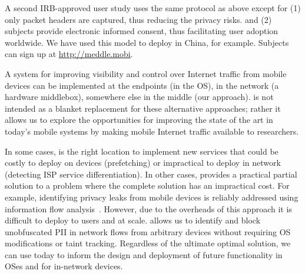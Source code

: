 A second IRB-approved \meddle user study uses the same protocol as above except 
for (1) only packet headers are captured, thus reducing the privacy risks. 
and (2) subjects provide electronic informed 
consent, thus facilitating user adoption worldwide. We have used this model to 
deploy \meddle in China, for example. Subjects can sign up at \url{http://meddle.mobi}.

 A system for improving visibility and control over Internet traffic from mobile 
devices can be implemented at the endpoints (\eg in the OS), in the network (\eg a hardware middlebox), 
somewhere else in the middle (our approach). \meddle is not intended as a blanket replacement for 
these alternative approaches; rather it allows us to explore the opportunities for improving the state of the 
art in today's mobile systems by making mobile Internet traffic available to researchers. 

In some cases, \meddle is the right location to implement new services that could be costly 
to deploy on devices (prefetching) or impractical to deploy in network (detecting ISP service differentiation). 
In other cases, \meddle provides a practical partial solution to a problem where the complete solution has an impractical 
cost. For example, identifying privacy leaks from mobile devices is reliably addressed using information flow 
analysis~\cite{enck:taintdroid}. However, due to the overheads of this approach it is difficult to deploy to users 
and at scale. \meddle allows us to identify and block unobfuscated PII in network flows from arbitrary devices without requiring 
OS modifications or taint tracking. Regardless of the ultimate optimal solution, we can use \meddle today to inform the design 
and deployment of future functionality in OSes and for in-network devices. 




